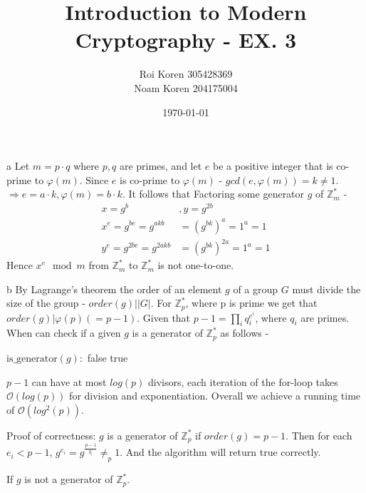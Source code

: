 \documentclass{article}
\makeatletter
\newcommand{\tpmod}[1]{{\@displayfalse\pmod{#1}}}
\makeatother
\begin{document}
\title{Introduction to Modern Cryptography - EX. 3}
\author{Roi Koren 305428369\\ Noam Koren 204175004}
\date{\today}
\maketitle
\newpage
{}

\section{}
\begin{paragraph}
	a Let $m=p\cdot q$ where $p,q$ are primes, and let $e$ be a 
	positive integer that is co-prime to $\varphi(m)$.
	Since $e$ is co-prime to $\varphi(m)$ - $gcd(e, \varphi(m)) = k \neq 1$.
	$\Rightarrow e = a\cdot k, \varphi(m) = b\cdot k$. It follows that Factoring
	some generator $g$ of $\mathbb{Z}^*_m$ - 
	\begin{align*}
		x = g^b&, y = g^{2b}\\
		x^e = g^{be} = g^{akb} &= (g^{bk})^a = 1^a = 1 \\
		y^e = g^{2be} = g^{2akb} &= (g^{bk})^{2a} = 1^a = 1
	\end{align*}
	Hence $x^e \mod m$ from $\mathbb{Z}^*_m$ to $\mathbb{Z}^*_m$ is not one-to-one.
\end{paragraph}

\begin{paragraph}
	b By Lagrange's theorem the order of an element $g$ of a group $G$
	must divide the size of the group - $order(g)| |G|$. For $\mathbb{Z}^*_p$,
	where p is prime we get that $order(g) | \varphi(p)(=p-1)$.
	Given that $p-1 =\prod_i{q_i^{e^i}}$, where $q_i$ are primes. When can
	check if a given $g$ is a generator of $\mathbb{Z}^*_p$ as follows - 

	\begin{algorithm}
	\begin{algorithmic}[]
		\State $\text{is\_generator}( \textit{g} ):$
			\If {$q_i^{\frac{p-1}{q_i}}= 1 \tpmod p$} \Return false
			\EndIf
		  \EndFor
		\State \Return true
	\end{algorithmic}
	\end{algorithm}

	$p-1$ can have at most $log(p)$ divisors, each iteration of the for-loop
	takes $\mathcal{O}(log(p))$ for division and exponentiation. Overall we achieve
	a running time of $\mathcal{O}(log^2(p))$.

	Proof of correctness: $g$ is a generator of $\mathbb{Z}^*_p$ if $order(g) = p -1$.
	Then for each $e_i < p - 1$, $g^{e_i} = g^{\frac{p-1}{q_i}} \neq_p 1$. And the 
	algorithm will return true correctly.

	If $g$ is not a generator of $\mathbb{Z}^*_p$.

\end{paragraph}
\end{document}

